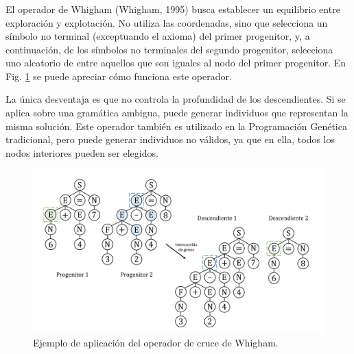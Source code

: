 \documentclass[spanish,a4paper,12pt,twoside]{report}
\begin{document}
        \subsubsection*{\vspace{-0.5cm}{\normalsize Operador de Whigham}}
        \vspace{-0.5cm}
        El operador de Whigham (Whigham, 1995) busca establecer un equilibrio entre exploración y explotación. No utiliza las coordenadas, sino que selecciona un símbolo no terminal (exceptuando el axioma) del primer progenitor, y, a continuación, de los símbolos no terminales del segundo progenitor, selecciona uno aleatorio de entre aquellos que son iguales al nodo del primer progenitor. En Fig. \ref{fig:9} se puede apreciar cómo funciona este operador. \par
        La única desventaja es que no controla la profundidad de los descendientes. Si se aplica sobre una gramática ambigua, puede generar individuos que representan la misma solución. Este operador también es utilizado en la Programación Genética tradicional, pero puede generar individuos no válidos, ya que en ella, todos los nodos interiores pueden ser elegidos. \par
        \begin{figure}[H]
          \centering
          \includegraphics[width = 1\textwidth]{resources/Fig9.pdf}
          \caption{Ejemplo de aplicación del operador de cruce de Whigham.}
          \label{fig:9}
        \end{figure} \par
        
\end{document}
